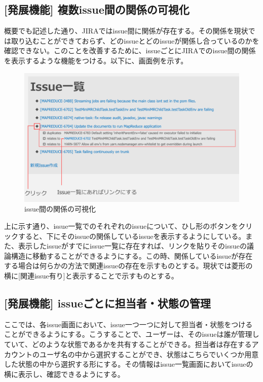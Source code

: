 \documentclass[12pt, oneside]{jreport}
\begin{document}
		\subsection{[発展機能] 複数issue間の関係の可視化}
		概要でも記述した通り、JIRAではissue間に関係が存在する。その関係を現状では取り込むことができておらず、どのissueとどのissueが関係し合っているのかを確認できない。このことを改善するために、issueごとにJIRAでのissue間の関係を表示するような機能をつける。以下に、画面例を示す。
		
		\begin{figure}[H]
		\centering
		\includegraphics[width=17cm,bb=300 300 -200 27]{RelatesVisualize.png}
		\caption{issue間の関係の可視化}
		\end{figure}
		
		上に示す通り、issue一覧でのそれぞれのissueについて、ひし形のボタンをクリックすると、下にそのissueの関係しているissueを表示するようにしている。また、表示したissueがすでにissue一覧に存在すれば、リンクを貼りそのissueの議論構造に移動することができるようにする。この時、関係しているissueが存在する場合は何らかの方法で関連issueの存在を示すものとする。現状では菱形の横に[関連issue有り]と表示することで示すものとする。

		\subsection{[発展機能] issueごとに担当者・状態の管理}
		ここでは、各issue画面において、issue一つ一つに対して担当者・状態をつけることができるようにする。こうすることで、ユーザーは、そのissueは誰が管理していて、どのような状態であるかを共有することができる。担当者は存在するアカウントのユーザ名の中から選択することができ、状態はこちらでいくつか用意した状態の中から選択する形にする。その情報はissue一覧画面においてissueの横に表示し、確認できるようにする。
		
\end{document}

